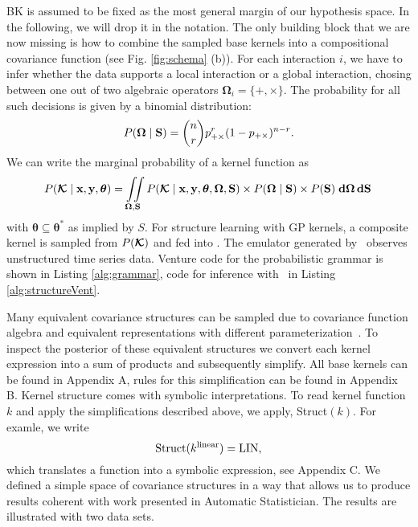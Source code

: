 BK is assumed to be fixed as the most general margin of our hypothesis space.
In the following, we will drop it in the notation.
The only building block that we are now missing is how to combine the sampled
base kernels into a compositional covariance function (see Fig. \ref{fig:schema}
(b)). For each interaction $i$, we
have to infer whether the data supports a local interaction or a global interaction,
chosing between one out of two algebraic operators
$\bm{\Omega}_i=\{+,\times\}$. The probability for all such decisions is given by a binomial distribution: 
\begin{equation}
P(\bm{\Omega} \mid \mathbf{S})= {n \choose r}  p_{+\times}^r (1 - p_{+\times})^{n-r}.
\end{equation}
We can write the marginal probability of a kernel function as 
\begin{equation}
P(\bm{\mathcal{K}} \mid \mathbf{x},\mathbf{y},\bm{\theta} ) = \iint \limits_{\bm{\Omega},\mathbf{S}}
P(\bm{\mathcal{K}} \mid \mathbf{x},\mathbf{y},\bm{\theta},\bm{\Omega},\mathbf{S}) \times P(\bm{\Omega} \mid \mathbf{S})\times
P(\mathbf{S})\; \text{\bf d}\bm{\Omega}\, \text{\bf d}\mathbf{S}\,
\end{equation}
with $\bm{\theta}\subseteq \bm{\theta}^*$ as implied by $S$.
For structure learning with \ac{GP} kernels, a composite kernel is
sampled from $P(\bm{\mathcal{K}})$ and fed into \gpmem. 
The emulator generated by \gpmem\ observes unstructured time series data.
Venture code for the probabilistic grammar is shown in Listing
\ref{alg:grammar}, code for inference with \gpmem\ in Listing
\ref{alg:structureVent}. 









Many equivalent covariance structures can be sampled due to covariance function algebra
and equivalent representations with different parameterization~\citep{lloyd2014automatic}.
To inspect the posterior of these equivalent structures we convert each kernel expression
into a sum of products and subsequently simplify. All base kernels can be found in Appendix A,
rules for this simplification can be found in Appendix B.
Kernel structure comes with symbolic interpretations. To read kernel function $k$
and apply the simplifications described above, we apply, Struct$(k)$. For
examle, we write
\[
\text{Struct}(k^\text{linear})=\text{LIN},
\]
which translates a function into a symbolic expression, see Appendix C. 
We defined a simple space of covariance structures in a way that allows us to produce results coherent with 
work presented in Automatic Statistician. The results are illustrated with two data sets.


